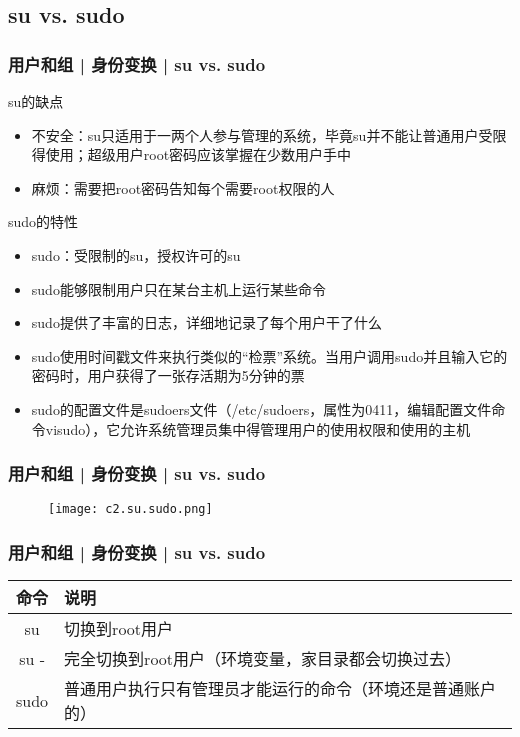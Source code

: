 \subsection{su vs. sudo}
\begin{frame}
  \frametitle{用户和组 | 身份变换 | su vs. sudo}
  \begin{block}{su的缺点}
    \begin{itemize}
      \item 不安全：su只适用于一两个人参与管理的系统，毕竟su并不能让普通用户受限得使用；超级用户root密码应该掌握在少数用户手中
      \item 麻烦：需要把root密码告知每个需要root权限的人
    \end{itemize}
  \end{block}
  \pause
  \begin{block}{sudo的特性}
    \begin{itemize}
      \item sudo：受限制的su，授权许可的su
      \item sudo能够限制用户只在某台主机上运行某些命令
      \item sudo提供了丰富的日志，详细地记录了每个用户干了什么
      \item sudo使用时间戳文件来执行类似的“检票”系统。当用户调用sudo并且输入它的密码时，用户获得了一张存活期为5分钟的票
      \item sudo的配置文件是sudoers文件（/etc/sudoers，属性为0411，编辑配置文件命令visudo），它允许系统管理员集中得管理用户的使用权限和使用的主机
    \end{itemize}
  \end{block}
\end{frame}

\begin{frame}
  \frametitle{用户和组 | 身份变换 | su vs. sudo}
  \begin{figure}
    \centering
    \texttt{[image: c2.su.sudo.png]}
  \end{figure}
\end{frame}

\begin{frame}
  \frametitle{用户和组 | 身份变换 | \alert{su vs. sudo}}
  \begin{table}
    \centering
    \begin{tabular}{cl}
      \hline
      \rowcolor{blue!50}命令 & 说明\\
      \hline
      su & 切换到root用户\\
      su - & 完全切换到root用户（环境变量，家目录都会切换过去）\\
      sudo & 普通用户执行只有管理员才能运行的命令（环境还是普通账户的）\\
      \hline
    \end{tabular}
  \end{table}
\end{frame}

